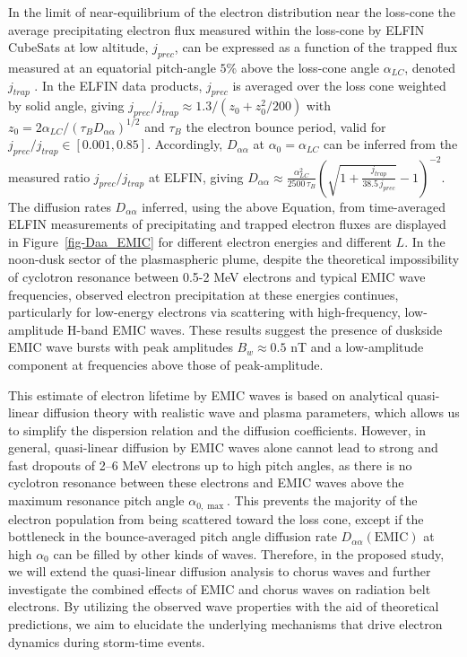 \documentclass[
  letterpaper,
  DIV=11,
  numbers=noendperiod]{scrartcl}
\begin{document}
In the limit of near-equilibrium of the electron distribution near the loss-cone \citep{kennelLimitStablyTrapped1966} the average precipitating electron flux measured within the loss-cone by ELFIN CubeSats at low altitude, \(j_{prec}\), can be expressed as a function of the trapped flux measured at an equatorial pitch-angle \(5\)\% above the loss-cone angle \(\alpha_{LC}\), denoted \(j_{trap}\) \citep{mourenasUpperLimitOuter2023}. In the ELFIN data products, \(j_{prec}\) is averaged over the loss cone weighted by solid angle, giving \(j_{prec}/j_{trap}\approx 1.3/(z_0+z_0^2/200)\) with \(z_0=2\alpha_{LC}/(\tau_B D_{\alpha\alpha})^{1/2}\) and \(\tau_B\) the electron bounce period, valid for \(j_{prec}/j_{trap}\in[0.001,0.85]\).
Accordingly, \(D_{\alpha\alpha}\) at \(\alpha_0=\alpha_{LC}\) can be inferred from the measured ratio \(j_{prec}/j_{trap}\) at ELFIN, giving \(D_{\alpha\alpha} \approx \frac{{\alpha_{LC}^2}}{{2500\, \tau_B }} \left(\sqrt{1+ \frac{{ j_{trap} }}{{ 38.5\, j_{prec} }} } -1 \right)^{-2}\).
The diffusion rates \(D_{\alpha\alpha}\) inferred, using the above Equation, from time-averaged ELFIN measurements of precipitating and trapped electron fluxes are displayed in Figure~\ref{fig-Daa_EMIC} for different electron energies and different \(L\). In the noon-dusk sector of the plasmaspheric plume, despite the theoretical impossibility of cyclotron resonance between 0.5-2 MeV electrons and typical EMIC wave frequencies, observed electron precipitation at these energies continues, particularly for low-energy electrons via scattering with high-frequency, low-amplitude H-band EMIC waves.
These results suggest the presence of duskside EMIC wave bursts with peak amplitudes \(B_w\approx 0.5\) nT and a low-amplitude component at frequencies above those of peak-amplitude.

This estimate of electron lifetime by EMIC waves is based on analytical quasi-linear diffusion theory with realistic wave and plasma parameters, which allows us to simplify the dispersion relation and the diffusion coefficients. However, in general, quasi-linear diffusion by EMIC waves alone cannot lead to strong and fast dropouts of 2--6 MeV electrons up to high pitch angles, as there is no cyclotron resonance between these electrons and EMIC waves above the maximum resonance pitch angle \(\alpha_{0,\max}\). This prevents the majority of the electron population from being scattered toward the loss cone, except if the bottleneck in the bounce-averaged pitch angle diffusion rate \(D_{\alpha\alpha}(\text{EMIC})\) at high \(\alpha_0\) can be filled by other kinds of waves. Therefore, in the proposed study, we will extend the quasi-linear diffusion analysis to chorus waves and further investigate the combined effects of EMIC and chorus waves on radiation belt electrons. By utilizing the observed wave properties with the aid of theoretical predictions, we aim to elucidate the underlying mechanisms that drive electron dynamics during storm-time events.
\end{document}
